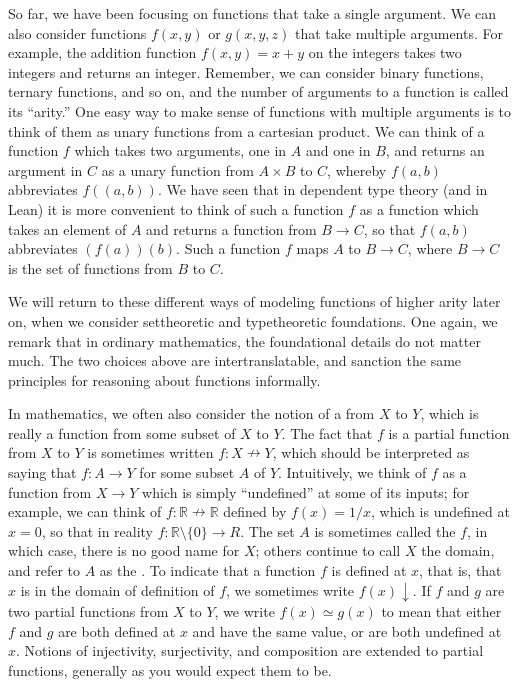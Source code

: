 \documentclass[letterpaper,10pt,english]{sphinxmanual}
\begin{document}
\sphinxAtStartPar
So far, we have been focusing on functions that take a single argument. We can also consider functions \(f(x, y)\) or \(g(x, y, z)\) that take multiple arguments. For example, the addition function \(f(x, y) = x + y\) on the integers takes two integers and returns an integer. Remember, we can consider binary functions, ternary functions, and so on, and the number of arguments to a function is called its “arity.” One easy way to make sense of functions with multiple arguments is to think of them as unary functions from a cartesian product. We can think of a function \(f\) which takes two arguments, one in \(A\) and one in \(B\), and returns an argument in \(C\) as a unary function from \(A \times B\) to \(C\), whereby \(f(a, b)\) abbreviates \(f((a, b))\). We have seen that in dependent type theory (and in Lean) it is more convenient to think of such a function \(f\) as a function which takes an element of \(A\) and returns a function from \(B \to C\), so that \(f(a, b)\) abbreviates \((f(a))(b)\). Such a function \(f\) maps \(A\) to \(B \to C\), where \(B \to C\) is the set of functions from \(B\) to \(C\).

\sphinxAtStartPar
We will return to these different ways of modeling functions of higher arity later on, when we consider set\sphinxhyphen{}theoretic and type\sphinxhyphen{}theoretic foundations. One again, we remark that in ordinary mathematics, the foundational details do not matter much. The two choices above are inter\sphinxhyphen{}translatable, and sanction the same principles for reasoning about functions informally.

\sphinxAtStartPar
In mathematics, we often also consider the notion of a  from \(X\) to \(Y\), which is really a function from some subset of \(X\) to \(Y\). The fact that \(f\) is a partial function from \(X\) to \(Y\) is sometimes written \(f : X \nrightarrow Y\), which should be interpreted as saying that \(f : A \to Y\) for some subset \(A\) of \(Y\). Intuitively, we think of \(f\) as a function from \(X \to Y\) which is simply “undefined” at some of its inputs; for example, we can think of \(f : \mathbb{R} \nrightarrow \mathbb{R}\) defined by \(f(x) = 1 / x\), which is undefined at \(x = 0\), so that in reality \(f : \mathbb{R} \setminus \{ 0 \} \to R\). The set \(A\) is sometimes called the  \(f\), in which case, there is no good name for \(X\); others continue to call \(X\) the domain, and refer to \(A\) as the . To indicate that a function \(f\) is defined at \(x\), that is, that \(x\) is in the domain of definition of \(f\), we sometimes write \(f(x) \downarrow\). If \(f\) and \(g\) are two partial functions from \(X\) to \(Y\), we write \(f(x) \simeq g(x)\) to mean that either \(f\) and \(g\) are both defined at \(x\) and have the same value, or are both undefined at \(x\). Notions of injectivity, surjectivity, and composition are extended to partial functions, generally as you would expect them to be.
\end{document}
